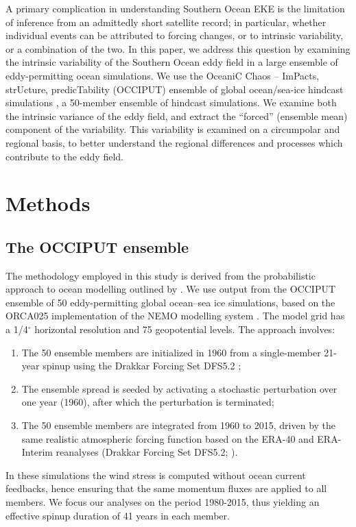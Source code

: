 \documentclass[linenumbers]{agujournal2019}
\begin{document}
A primary complication in understanding Southern Ocean EKE is the limitation of inference from an admittedly short satellite record; in particular, whether individual events can be attributed to forcing changes, or to intrinsic variability, or a combination of the two.
In this paper, we address this question by examining the intrinsic variability of the Southern Ocean eddy field in a large ensemble of eddy-permitting ocean simulations.
We use the OceaniC Chaos – ImPacts, strUcture, predicTability (OCCIPUT) ensemble of global ocean/sea-ice hindcast simulations \citep{Penduff-etal-2014, Leroux2018}, a 50-member ensemble of hindcast simulations.
We examine both the intrinsic variance of the eddy field, and extract the ``forced'' (ensemble mean) component of the variability.
This variability is examined on a circumpolar and regional basis, to better understand the regional differences and processes which contribute to the eddy field.



\section{Methods}

\subsection{The OCCIPUT ensemble}

The methodology employed in this study is derived from the probabilistic approach to ocean modelling outlined by \citet{Bessieres2017}.
We use output from the OCCIPUT ensemble of 50 eddy-permitting global ocean--sea ice simulations, based on the ORCA025 implementation \citep[e.g.][]{Barnier2006} of the NEMO modelling system \citep{Madec2012}. 
The model grid has a 1/4$^\circ$ horizontal resolution and 75 geopotential levels. 
The approach involves:
\begin{enumerate}
\item The 50 ensemble members are initialized in 1960 from a single-member 21-year spinup using the Drakkar Forcing Set DFS5.2 \citep{Dussin-etal-2016};
\item The ensemble spread is seeded by activating a stochastic perturbation \citep{Brankart-etal-2015} over one year (1960), after which the perturbation is terminated;
\item The 50 ensemble members are integrated from 1960 to 2015, driven by the same realistic atmospheric forcing function based on the ERA-40 and ERA-Interim reanalyses (Drakkar Forcing Set DFS5.2; \citet{Dussin-etal-2016}).
\end{enumerate}
In these simulations the wind stress is computed without ocean current feedbacks, hence ensuring that the same momentum fluxes are applied to all members. 
We focus our analyses on the period 1980-2015, thus yielding an effective spinup duration of 41 years in each member. 
\end{document}
